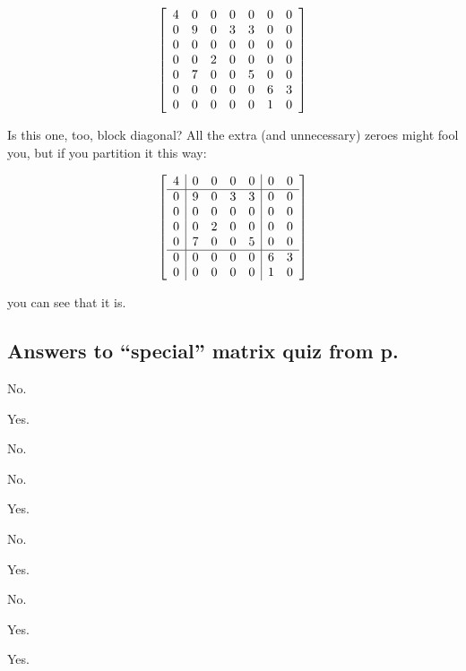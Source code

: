 \vspace{-.15in}
\begin{align*}
\mleft[
\begin{array}{ccccccc}
4 & 0 & 0 & 0 & 0 & 0 & 0\\
0 & 9 & 0 & 3 & 3 & 0 & 0\\
0 & 0 & 0 & 0 & 0 & 0 & 0\\
0 & 0 & 2 & 0 & 0 & 0 & 0\\
0 & 7 & 0 & 0 & 5 & 0 & 0\\
0 & 0 & 0 & 0 & 0 & 6 & 3\\
0 & 0 & 0 & 0 & 0 & 1 & 0\\
\end{array}
\mright]
\end{align*}
\vspace{-.15in}

Is this one, too, block diagonal? All the extra (and unnecessary) zeroes might
fool you, but if you partition it this way:

\vspace{-.15in}
\begin{align*}
\mleft[
\begin{array}{c|cccc|cc}
4 & 0 & 0 & 0 & 0 & 0 & 0\\
\hline
0 & 9 & 0 & 3 & 3 & 0 & 0\\
0 & 0 & 0 & 0 & 0 & 0 & 0\\
0 & 0 & 2 & 0 & 0 & 0 & 0\\
0 & 7 & 0 & 0 & 5 & 0 & 0\\
\hline
0 & 0 & 0 & 0 & 0 & 6 & 3\\
0 & 0 & 0 & 0 & 0 & 1 & 0\\
\end{array}
\mright]
\end{align*}
\vspace{-.15in}

you can see that it is.

\bigskip

\subsection*{Answers to ``special'' matrix quiz from
p.~\pageref{specialMatrixQuiz}}

\label{specialMatrixQuizSols}

\begin{multicols}{3}
\begin{compactenum}
\item No.
\item Yes.
\item No.
\item No.
\item Yes.
\item No.
\item Yes.
\item No.
\item Yes.
\item Yes.
\end{compactenum}
\end{multicols}

